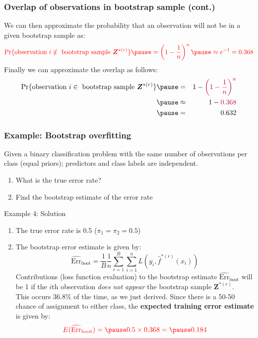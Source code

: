 \documentclass[smaller]{beamer}
\newcommand{\lt}{\left}
\newcommand{\rt}{\right}
\newcommand{\?}{\stackrel{?}{=}}
\newcommand{\fr}{\frac}
\newcommand{\rd}{\color{red}}
\newcommand{\pl}{\color{purple}}
\newcommand{\Err}{\text{Err}}
\begin{document}
\begin{frame}
  \frametitle{Overlap of observations in bootstrap sample (cont.)}
  \pause
  We can then approximate the probability that an observation will not be in a given bootstrap sample as:\pause
  \begin{equation}\rd
    \Pr\{\text{observation } i \notin \text{ bootstrap sample } \bm Z^{*(r)} \}
    \pause  = \lt(1 - \fr1n\rt)^n  \pause
    \approx e^{-1} = 0.368
  \end{equation}
  \pause
  Finally we can approximate the overlap as follows:\pause
  \begin{eqnarray*}
     \Pr\{\text{observation } i \in \text{ bootstrap sample } \bm Z^{*(r)} \} \pause &=&
    1 -  {\pl \lt(1 - \fr1n\rt)^n}\\
    \pause &\approx& 1 - {\pl 0.368}\\  \pause
    & =& 0.632
   \end{eqnarray*}
\end{frame}
\begin{frame}
  \frametitle{Example: Bootstrap overfitting}\pause
  Given a binary classification problem with the same number of observations per class (equal priors); predictors and class labels are independent. 
  \begin{enumerate}[a]
  \item What is the true error rate? \pause 
  \item Find the bootstrap estimate of the error rate
  \end{enumerate}
  \pause

  \begin{exampleblock}{Example 4: Solution}
    \pause
    \begin{enumerate}[\bf a]
    \item The true error rate is 0.5 ($\pi_{1} = \pi_{2} = 0.5$) \pause

    \item The bootstrap error estimate is given by:\pause
    \begin{equation}
         \widehat{\Err}_{\text{boot}} = \fr1B\fr1n\sum_{r=1}^B\sum_{i=1}^n L(y_i,\hat f^{*(r)}(x_i))
       \end{equation}
       \pause
  Contributions (loss function evaluation) to the bootstrap estimate $ \widehat{\Err}_{\text{boot}} $
  will be 1 if the $i$th observation \textit{does not appear} the bootstrap sample $ \bm Z^{*(r)}$. \\
  \pause
  This occurs 36.8\% of the time, as we just derived. \pause
  Since there is a 50-50 chance of assignment to either class, \pause
  the \textbf{\rd expected training error estimate} is given by:\pause
  \begin{equation*}\rd
    E(\widehat{\Err}_{\text{boot}}) = \pause 0.5 \times 0.368 = \pause 0.184
  \end{equation*}
    \end{enumerate}
 
\end{exampleblock}

  

\end{frame}
\end{document}
